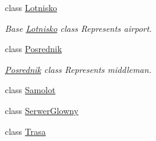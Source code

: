 \begin{DoxyCompactItemize}
class \mbox{\hyperlink{class_silnik_1_1_lotnisko}{Lotnisko}}
\begin{DoxyCompactList}\small\item\em Base \mbox{\hyperlink{class_silnik_1_1_lotnisko}{Lotnisko}} class Represents airport. \end{DoxyCompactList}\item 
class \mbox{\hyperlink{class_silnik_1_1_posrednik}{Posrednik}}
\begin{DoxyCompactList}\small\item\em \mbox{\hyperlink{class_silnik_1_1_posrednik}{Posrednik}} class Represents middleman. \end{DoxyCompactList}\item 
class \mbox{\hyperlink{class_silnik_1_1_samolot}{Samolot}}
\item 
class \mbox{\hyperlink{class_silnik_1_1_serwer_glowny}{Serwer\+Glowny}}
\item 
class \mbox{\hyperlink{class_silnik_1_1_trasa}{Trasa}}
\end{DoxyCompactItemize}
